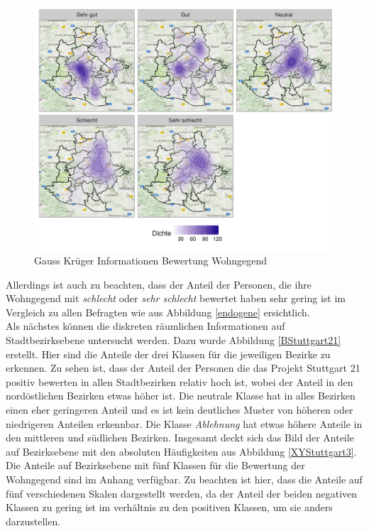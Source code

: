 \documentclass{Vorlage}
\begin{document}
\begin{figure}[h]
 \begin{center}
 \includegraphics[scale=0.8]{Pictures/XYWohnG5}
 \caption{Gauss Krüger Informationen Bewertung Wohngegend}
 \label{XYWohnG5}
 \end{center}
\end{figure}

Allerdings ist auch zu beachten, dass der Anteil der Personen, die ihre Wohngegend mit \textit{schlecht} oder \textit{sehr schlecht} bewertet haben sehr gering ist im Vergleich zu allen Befragten wie aus Abbildung \ref{endogene} ersichtlich.\\
Als nächstes können die diskreten räumlichen Informationen auf Stadtbezirksebene untersucht werden. Dazu wurde Abbildung \ref{BStuttgart21} erstellt. Hier sind die Anteile der drei Klassen für die jeweiligen Bezirke zu erkennen. Zu sehen ist, dass der Anteil der Personen die das Projekt Stuttgart 21 positiv bewerten in allen Stadtbezirken relativ hoch ist, wobei der Anteil in den nordöstlichen Bezirken etwas höher ist. Die neutrale Klasse hat in alles Bezirken einen eher geringeren Anteil und es ist kein deutliches Muster von höheren oder niedrigeren Anteilen erkennbar. Die Klasse \textit{Ablehnung} hat etwas höhere Anteile in den mittleren und südlichen Bezirken. Insgesamt deckt sich das Bild der Anteile auf Bezirksebene mit den absoluten Häufigkeiten aus Abbildung \ref{XYStuttgart3}. Die Anteile auf Bezirksebene mit fünf Klassen für die Bewertung der Wohngegend sind im Anhang verfügbar. Zu beachten ist hier, dass die Anteile auf fünf verschiedenen Skalen dargestellt werden, da der Anteil der beiden negativen Klassen zu gering ist im verhältnis zu den positiven Klassen, um sie anders darzustellen.
\end{document}
